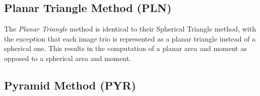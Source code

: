 
\subsection{Planar Triangle Method (PLN)}\label{subsec:coleAndCrassidus'sPlanarTriangleMethod}
The \textit{Planar Triangle} method is identical to their Spherical Triangle method, with the exception that each image
trio is represented as a planar triangle instead of a spherical one.
This results in the computation of a planar area and moment as opposed to a spherical area and moment.

\subsection{Pyramid Method (PYR)}\label{subsec:pyramidMethod}
